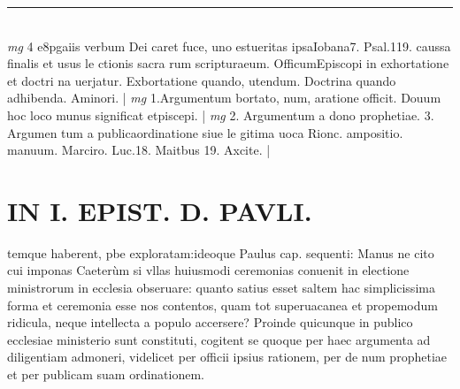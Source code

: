 \documentclass{article}
\begin{document}
\begin{pages}
\vspace{0.5cm}\noindent
\vspace{0.2cm}\rule{1cm}{0.2pt}\\ 
\hspace{0.2cm}\textit{mg}
\footnotesize 4 e8pgaiis verbum Dei caret fuce, uno estueritas ipsaIobana7. Psal.119. caussa finalis et usus le ctionis sacra rum scripturaeum. OfficumEpiscopi in exhortatione et doctri na uerjatur. Exbortatione quando, utendum. Doctrina quando adhibenda. Aminori. 
\normalsize| 
\hspace{0.2cm}\textit{mg}
\footnotesize 1.Argumentum bortato, num, aratione officit. Douum hoc loco munus significat etpiscepi. 
\normalsize| 
\hspace{0.2cm}\textit{mg}
\footnotesize 2. Argumentum a dono prophetiae. 3. Argumen tum a publicaordinatione siue le gitima uoca Rionc. ampositio. manuum. Marciro. Luc.18. Maitbus 19. Axcite. 
\normalsize| 
\section*{IN I. EPIST. D. PAVLI. }
\marginpar{[ p.102 ]}\pstart temque haberent, pbe exploratam:ideoque Paulus cap. sequenti: Manus ne cito cui imponas  \pend\pstart Caeterùm si vllas huiusmodi ceremonias conuenit in electione ministrorum in ecclesia obseruare: quanto satius esset saltem hac simplicissima forma et ceremonia esse nos contentos, quam tot superuacanea et propemodum ridicula, neque intellecta a populo accersere? Proinde quicunque in publico ecclesiae ministerio sunt constituti, cogitent se quoque  per haec argumenta ad diligentiam admoneri, videlicet per officii ipsius rationem, per de num prophetiae et per publicam suam ordinationem.  \pend
{}
{}

\end{pages}
\end{document}
